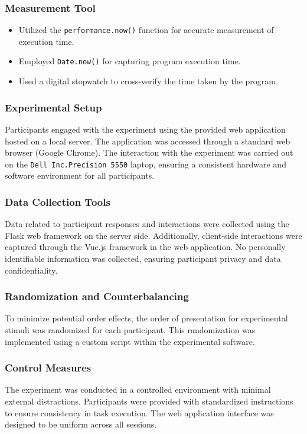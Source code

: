 \documentclass{article}
\begin{document}
\subsubsection*{Measurement Tool}
    \begin{itemize}
      \item Utilized the \texttt{performance.now()} function for accurate measurement of execution time.
      \item Employed \texttt{Date.now()} for capturing program execution time.
      \item Used a digital stopwatch to cross-verify the time taken by the program.
    \end{itemize}

\subsubsection*{Experimental Setup}
Participants engaged with the experiment using the provided web application hosted on a local server. The application was accessed through a standard web browser (Google Chrome). The interaction with the experiment was carried out on the \texttt{Dell Inc.Precision 5550} laptop, ensuring a consistent hardware and software environment for all participants.

\subsubsection*{Data Collection Tools}
Data related to participant responses and interactions were collected using the Flask web framework on the server side. Additionally, client-side interactions were captured through the Vue.js framework in the web application. No personally identifiable information was collected, ensuring participant privacy and data confidentiality.

\subsubsection*{Randomization and Counterbalancing}
To minimize potential order effects, the order of presentation for experimental stimuli was randomized for each participant. This randomization was implemented using a custom script within the experimental software.

\subsubsection*{Control Measures}
The experiment was conducted in a controlled environment with minimal external distractions. Participants were provided with standardized instructions to ensure consistency in task execution. The web application interface was designed to be uniform across all sessions.
\end{document}
